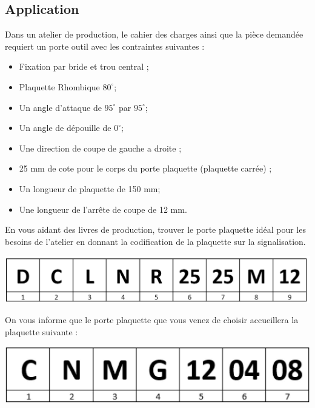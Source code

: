 \documentclass[12pt,a4paper]{article} %
\begin{document}
\subsection{Application}
\begin{tcolorbox}[colback=blue!5!white,colframe=red!75!black]
   \bcdodecaedre Dans un atelier de production, le cahier des charges ainsi que la pièce demandée requiert un porte outil avec les contraintes suivantes :

\begin{itemize}
\item Fixation par bride et trou central ;
\item Plaquette Rhombique $80^{\circ}$;
\item Un angle d'attaque de $95^{\circ}$ par $95^{\circ}$;
\item Un angle de dépouille de $0^{\circ}$;
\item Une direction de coupe de gauche a droite ;
\item 25 mm de cote pour le corps du porte plaquette (plaquette carrée) ;
\item Un longueur de plaquette de 150 mm;
\item Une longueur de l'arrête de coupe de 12 mm.
\end{itemize}
  
\end{tcolorbox}
\begin{exo} En vous aidant des livres de production, trouver le porte plaquette idéal pour les besoins de l'atelier en donnant la codification de la plaquette sur la signalisation. \end{exo}


\begin{center}
\includegraphics[width=0.85\linewidth]{CORR7.png}
\end{center}

\begin{tcolorbox}[colback=blue!5!white,colframe=red!75!black]
   \bcdodecaedre On vous informe que le porte plaquette que vous venez de choisir accueillera la plaquette suivante :
\begin{center}
\includegraphics[width=0.7\linewidth]{PLA26.JPG}
\end{center}   
  
\end{tcolorbox}
\end{document}

